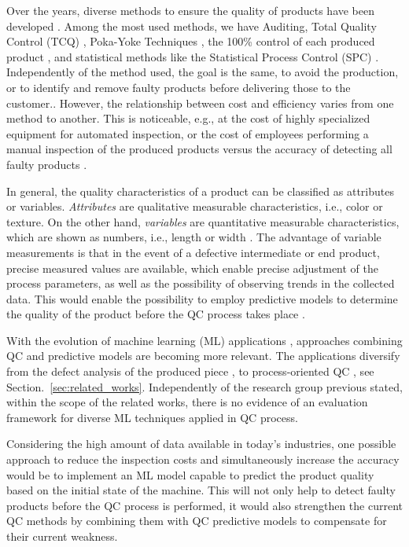 \documentclass[5p,times,procedia]{elsarticle}
\begin{document}
Over the years, diverse methods to ensure the quality of products have been developed \cite{mitra2016fundamentals}.
Among the most used methods, we have Auditing, Total Quality Control (TCQ) \cite{illes2017new}, Poka-Yoke Techniques \cite{Robinson2011UsingPT}, the 100\% control of each produced product \cite{Hinckley1997QC}, and statistical methods like the Statistical Process Control (SPC) \cite{selvamuthu2018introduction}.
Independently of the method used, the goal is the same, to avoid the production, or to identify and remove faulty products before delivering those to the customer.\cite{mitra2016fundamentals}.
However, the relationship between cost and efficiency varies from one method to another. This is noticeable, e.g., at the cost of highly specialized equipment for automated inspection, or the cost of employees performing a manual inspection of the produced products versus the accuracy of detecting all faulty products \cite{Diego1998QCCost}.

In general, the quality characteristics of a product can be classified as attributes or variables.
\textit{Attributes} are qualitative measurable characteristics, i.e., color or texture. On the other hand, \textit{variables} are quantitative measurable characteristics, which are shown as numbers, i.e., length or width \cite{mitra2016fundamentals}. 
The advantage of variable measurements is that in the event of a defective intermediate or end product, precise measured values are available, which enable precise adjustment of the process parameters, as well as the possibility of observing trends in the collected data. This would enable the possibility to employ predictive models to determine the quality of the product before the QC process takes place \cite{bishop2006pattern, krauss2019machine}.

With the evolution of machine learning (ML) applications \cite{goodfellow2016deep}, approaches combining QC and predictive models are becoming more relevant. The applications diversify from the defect analysis of the produced piece \cite{Carlos2018MLforQC, Sohnius2019PASurfacequality}, to process-oriented QC \cite{krauss2020automated, krauss2019machine, aumi2012model, ritter1992neue}, see Section.~\ref{sec:related_works}. 
Independently of the research group previous stated, within the scope of the related works, there is no evidence of an evaluation framework for diverse ML techniques applied in QC process.

Considering the high amount of data available in today's industries, one possible approach to reduce the inspection costs and simultaneously  increase the accuracy would be to implement an ML model capable to predict the product quality based on the initial state of the machine. This will not only help to detect faulty products before the QC process is performed, it would also strengthen the current QC methods by combining them with QC predictive models to compensate for their current weakness.
\end{document}
